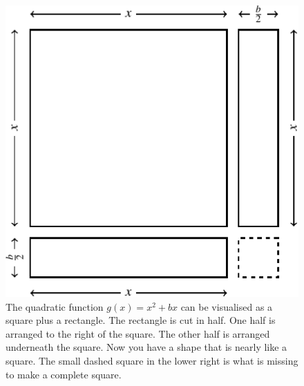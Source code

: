 \documentclass[a4paper,oneside,12pt]{article}
\begin{document}
\begin{figure}[!htbp]
\centering
\includegraphics[scale=1.1]{image/10/complete-square-a1-c0_halfb.pdf}
\caption{%
  The quadratic function $g(x) = x^2 + bx$ can be visualised as a
  square plus a rectangle.  The rectangle is cut in half.  One half is
  arranged to the right of the square.  The other half is arranged
  underneath the square.  Now you have a shape that is nearly like a
  square.  The small dashed square in the lower right is what is
  missing to make a complete square.
}
\label{fig:}
\end{figure}
\end{document}
